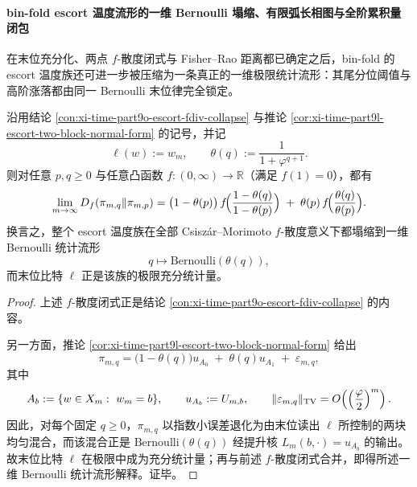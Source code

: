 \paragraph{bin-fold escort 温度流形的一维 Bernoulli 塌缩、有限弧长相图与全阶累积量闭包}
在末位充分化、两点 \texorpdfstring{$f$}{f}-散度闭式与 Fisher--Rao 距离都已确定之后，bin-fold 的 escort 温度族还可进一步被压缩为一条真正的一维极限统计流形：其尾分位阈值与高阶涨落都由同一 Bernoulli 末位律完全锁定。

\begin{theorem}\label{thm:xi-time-part9ob-escort-lastbit-bernoulli-fdiv}
沿用结论 \ref{con:xi-time-part9o-escort-fdiv-collapse} 与推论 \ref{cor:xi-time-part9l-escort-two-block-normal-form} 的记号，并记
\[
\ell(w):=w_m,
\qquad
\theta(q):=\frac{1}{1+\varphi^{q+1}}.
\]
则对任意 \(p,q\ge 0\) 与任意凸函数 \(f:(0,\infty)\to \mathbb R\)（满足 \(f(1)=0\)），都有
\[
\lim_{m\to\infty}D_f(\pi_{m,q}\Vert \pi_{m,p})
=
\bigl(1-\theta(p)\bigr)\,
f\!\Bigl(\frac{1-\theta(q)}{1-\theta(p)}\Bigr)
\;+\;
\theta(p)\,
f\!\Bigl(\frac{\theta(q)}{\theta(p)}\Bigr).
\]
换言之，整个 escort 温度族在全部 Csisz\'ar--Morimoto \(f\)-散度意义下都塌缩到一维 Bernoulli 统计流形
\[
q\longmapsto \mathrm{Bernoulli}(\theta(q)),
\]
而末位比特 \(\ell\) 正是该族的极限充分统计量。
\end{theorem}
\begin{proof}
上述 \(f\)-散度闭式正是结论 \ref{con:xi-time-part9o-escort-fdiv-collapse} 的内容。

另一方面，推论 \ref{cor:xi-time-part9l-escort-two-block-normal-form} 给出
\[
\pi_{m,q}
=
\bigl(1-\theta(q)\bigr)u_{A_0}
\;+\;
\theta(q)u_{A_1}
\;+\;
\varepsilon_{m,q},
\]
其中
\[
A_b:=\{w\in X_m:\ w_m=b\},
\qquad
u_{A_b}:=U_{m,b},
\qquad
\|\varepsilon_{m,q}\|_{\mathrm{TV}}
=
O\!\left(\Bigl(\frac{\varphi}{2}\Bigr)^m\right).
\]
因此，对每个固定 \(q\ge 0\)，\(\pi_{m,q}\) 以指数小误差退化为由末位读出 \(\ell\) 所控制的两块均匀混合，而该混合正是 \(\mathrm{Bernoulli}(\theta(q))\) 经提升核 \(L_m(b,\cdot)=u_{A_b}\) 的输出。故末位比特 \(\ell\) 在极限中成为充分统计量；再与前述 \(f\)-散度闭式合并，即得所述一维 Bernoulli 统计流形解释。证毕。
\end{proof}

